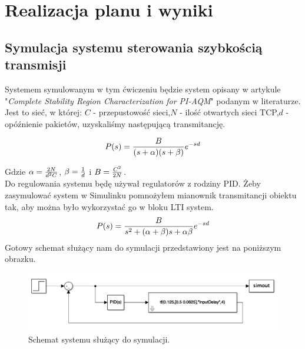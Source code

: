 \documentclass[a4paper,10pt]{article}
\begin{document}
\section{Realizacja planu i wyniki}

\subsection{Symulacja systemu sterowania szybkością transmisji}
Systemem symulowanym w tym ćwiczeniu będzie system opisany w artykule "\textit{Complete Stability Region
	Characterization for PI-AQM}" podanym w literaturze. Jest to sieć, w której:
\newline $C$ - przepustowość sieci,\newline $N$ - ilość otwartych sieci TCP,\newline  $d$ - opóźnienie pakietów, uzyskaliśmy następującą transmitancję.

\begin{equation} \label{eqn:transO}
P(s)={B \over (s + \alpha) (s + \beta)}e^{-sd}
\end{equation}

Gdzie $\alpha = {2N \over d^{2}C}$, $\beta = {1 \over d}$ i $B = {C^2 \over 2N}$.\\

Do regulowania systemu będę używał regulatorów z rodziny PID.
\newline\newline Żeby zasymulować system w Simulinku pomnożyłem mianownik transmitancji obiektu tak, aby można było wykorzystać go w bloku LTI system.
\begin{equation} \label{eqn:transO}
P(s)={B \over s^{2} + (\alpha + \beta)s + \alpha \beta}e^{-sd}
\end{equation}
Gotowy schemat służący nam do symulacji przedstawiony jest na poniższym obrazku.

\begin{figure}[!h]
    \centering
	\includegraphics[width=120mm]{schemat.png}
	\caption{Schemat systemu służący do symulacji.}
    \label{fig:Rysunek}
\end{figure}
\end{document}
